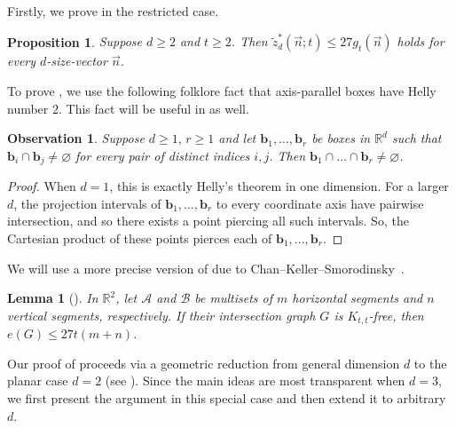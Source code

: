 \documentclass[11pt]{article}
\newtheorem{lemma}[theorem]{Lemma}
\newtheorem{proposition}[theorem]{Proposition}
\newtheorem{observation}[theorem]{Observation}
\theoremstyle{definition}
\newcommand*{\R}{\mathbb{R}}                                    %
\newcommand*{\cB}{\mathcal{B}}
\newcommand*{\cA}{\mathcal{A}}
\newcommand*{\vn}{\vec{n}}
\newcommand*{\wz}{\widetilde{z}}
\begin{document}
Firstly, we prove  in the restricted case. 

\begin{proposition} \label{prop:upper_restricted}
    Suppose $d \ge 2$ and $t \ge 2$. Then $\wz_d^*(\vn; t) \le 27 g_t(\vn)$ holds for every $d$-size-vector $\vn$.
\end{proposition}

To prove , we use the following folklore fact that axis-parallel boxes have Helly number $2$.
This fact will be useful in  as well. 

\begin{observation} \label{obs:box_helly}
    Suppose $d \ge 1, \, r \ge 1$ and let $\bm{b}_1, \dots, \bm{b}_r$ be boxes in $\R^d$ such that $\bm{b}_i \cap \bm{b}_j \ne \varnothing$ for every pair of distinct indices $i, j$.
    Then $\bm{b}_1 \cap \dots \cap \bm{b}_r \ne \varnothing$. 
\end{observation}

\begin{proof}
    When $d = 1$, this is exactly Helly's theorem in one dimension. For a larger $d$, the projection intervals of $\bm{b}_1, \dots, \bm{b}_r$ to every coordinate axis have pairwise intersection, and so there exists a point piercing all such intervals. So, the Cartesian product of these points pierces each of $\bm{b}_1, \dots, \bm{b}_r$. 
\end{proof}

We will use a more precise version of  due to Chan--Keller--Smorodinsky~\cite{chan_keller_smorodinsky_arxiv}. 

\begin{lemma}[{\cite[Proposition 2.4]{chan_keller_smorodinsky_arxiv}}] \label{lem:COZ_CKS}
    In $\R^2$, let $\cA$ and $\cB$ be multisets of $m$ horizontal segments and $n$ vertical segments, respectively. If their intersection graph $G$ is $K_{t, t}$-free, then $e(G) \le 27t(m + n)$. 
\end{lemma}

Our proof of  proceeds via a geometric reduction from general dimension $d$ to the planar case $d = 2$ (see ). Since the main ideas are most transparent when $d = 3$, we first present the argument in this special case and then extend it to arbitrary $d$.
\end{document}
